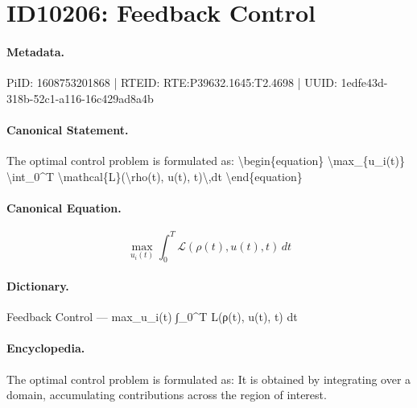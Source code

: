 \section*{ID10206: Feedback Control}
\paragraph{Metadata.}
PiID: 1608753201868 | RTEID: RTE:P39632.1645:T2.4698 | UUID: 1edfe43d-318b-52c1-a116-16c429ad8a4b

\paragraph{Canonical Statement.}
The optimal control problem is formulated as: \textbackslash{}begin\{equation\} \textbackslash{}max\_\{u\_i(t)\} \textbackslash{}int\_0\textasciicircum{}T \textbackslash{}mathcal\{L\}(\textbackslash{}rho(t), u(t), t)\textbackslash{},dt \textbackslash{}end\{equation\}

\paragraph{Canonical Equation.}
\[
\max_{u_i(t)} \int_0^T \mathcal{L}(\rho(t), u(t), t)\,dt
\]

\paragraph{Dictionary.}
Feedback Control — max\_u\_i(t) ∫\_0\textasciicircum{}T L(ρ(t), u(t), t) dt

\paragraph{Encyclopedia.}
The optimal control problem is formulated as: It is obtained by integrating over a domain, accumulating contributions across the region of interest.

